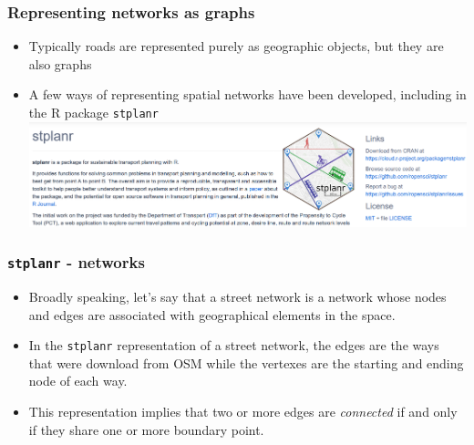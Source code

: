 \documentclass[c,10pt,pdftex]{beamer}
\begin{document}
\begin{frame}
  \frametitle{Representing networks as graphs}
  \vspace{-0.75cm}
  \begin{itemize}
    \setlength\itemsep{1em}
    \item Typically roads are represented purely as geographic objects, but they are also graphs
    \item A few ways of representing spatial networks have been developed, including in the R package \texttt{stplanr}
    \includegraphics[width = 1.05\linewidth]{images/stplanr-wide-screenshot}
  \end{itemize}
\end{frame}

% 

\begin{frame}
  \frametitle{\texttt{stplanr} - networks}
  \vspace{-0.75cm}
  \begin{itemize}
    \setlength\itemsep{1em}
    \item Broadly speaking, let's say that a street network is a network whose nodes and edges are associated with geographical elements in the space. 
    \item In the \texttt{stplanr} representation of a street network, the edges are the ways that were download from OSM while the vertexes are the starting and ending node of each way. 
    \item This representation implies that two or more edges are \textit{connected} if and only if they share one or more boundary point. 
  \end{itemize}
\end{frame}
\end{document}
